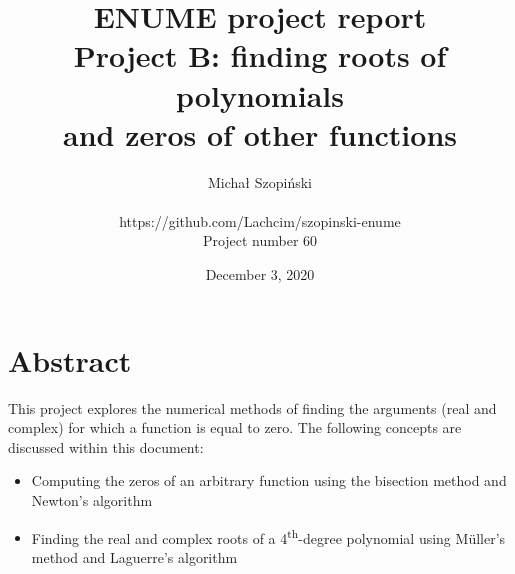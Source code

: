 \documentclass{article}
\begin{document}
	\title{ENUME project report\\Project B: finding roots of polynomials \\
	and zeros of other functions}
	\author{Michał Szopiński\\\\
	https://github.com/Lachcim/szopinski-enume\\
	Project number 60}
	\date{December 3, 2020}
	\maketitle
	
	
	\setcounter{section}{-1}
	\section{Abstract}
	
	This project explores the numerical methods of finding the arguments (real
	and complex) for which a function is equal to zero. The following concepts
	are discussed within this document:
	
	\begin{itemize}
		\item Computing the zeros of an arbitrary function using the bisection
		method and Newton's algorithm
		\item Finding the real and complex roots of a
		4\textsuperscript{th}-degree polynomial using M{\"u}ller's method and
		Laguerre's algorithm
	\end{itemize}
	
	\newpage
	
\end{document}
